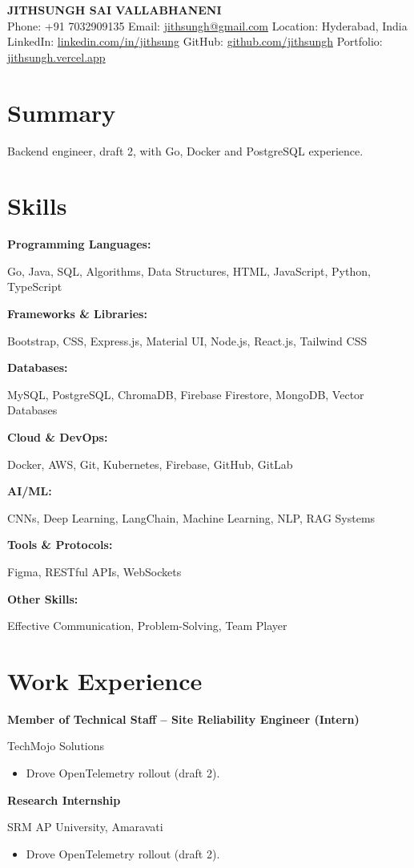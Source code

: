 \documentclass[a4paper,10pt]{article}
\newcommand{\tworow}[2]{%
  \noindent%
  \begin{minipage}[t]{0.615\textwidth}\raggedright #1\end{minipage}%
  \hfill%
  \begin{minipage}[t]{0.365\textwidth}\raggedleft #2\end{minipage}%
  \par%
}
\newcommand{\resumeheader}[3]{%
  \begin{center}
    {\LARGE \textbf{#1}} \\[0.5em]
    \small #2 \\[0.3em]
    \small #3
  \end{center}
}
\newcommand{\expentry}[3]{%
  \tworow{\textbf{#1}}{#2}%
  \ifx\relax#3\relax\else\textit{\small #3}\par\fi
}
\newenvironment{rbullets}{%
  \vspace{0.12em}%
  \begin{itemize}[leftmargin=1.1em, labelsep=0.4em, label=\textbullet,
                  itemsep=0.12em, topsep=0.08em, parsep=0pt, partopsep=0pt]%
}{%
  \end{itemize}%
}
\newcommand{\entrygap}{\vspace{0.55em}}
\newcommand{\skillrow}[2]{%
  \noindent%
  \begin{minipage}[t]{0.27\textwidth}\raggedright\textbf{#1}\end{minipage}%
  \begin{minipage}[t]{0.73\textwidth}\raggedright #2\end{minipage}%
  \par\vspace{0.18em}%
}
\begin{document}
\resumeheader{JITHSUNGH SAI VALLABHANENI}{%
  Phone: +91 7032909135 \quad  Email: \href{mailto:jithsungh@gmail.com}{jithsungh@gmail.com} \quad  Location: Hyderabad, India }{%
  LinkedIn: \href{https://linkedin.com/in/jithsung}{linkedin.com/in/jithsung} \quad  GitHub: \href{https://github.com/jithsungh}{github.com/jithsungh} \quad  Portfolio: \href{https://jithsungh.vercel.app}{jithsungh.vercel.app} }

\section*{Summary}
Backend engineer, draft 2, with Go, Docker and PostgreSQL experience.

\section*{Skills}
\skillrow{Programming Languages:}{Go, Java, SQL, Algorithms, Data Structures, HTML, JavaScript, Python, TypeScript}
\skillrow{Frameworks \& Libraries:}{Bootstrap, CSS, Express.js, Material UI, Node.js, React.js, Tailwind CSS}
\skillrow{Databases:}{MySQL, PostgreSQL, ChromaDB, Firebase Firestore, MongoDB, Vector Databases}
\skillrow{Cloud \& DevOps:}{Docker, AWS, Git, Kubernetes, Firebase, GitHub, GitLab}
\skillrow{AI/ML:}{CNNs, Deep Learning, LangChain, Machine Learning, NLP, RAG Systems}
\skillrow{Tools \& Protocols:}{Figma, RESTful APIs, WebSockets}
\skillrow{Other Skills:}{Effective Communication, Problem-Solving, Team Player}

\section*{Work Experience}
\expentry{Member of Technical Staff -- Site Reliability Engineer (Intern)}{TechMojo Solutions}{}
\begin{rbullets}
  \item Drove OpenTelemetry rollout (draft 2).
\end{rbullets}
\entrygap
\expentry{Research Internship}{SRM AP University, Amaravati}{}
\begin{rbullets}
  \item Drove OpenTelemetry rollout (draft 2).
\end{rbullets}
\end{document}
